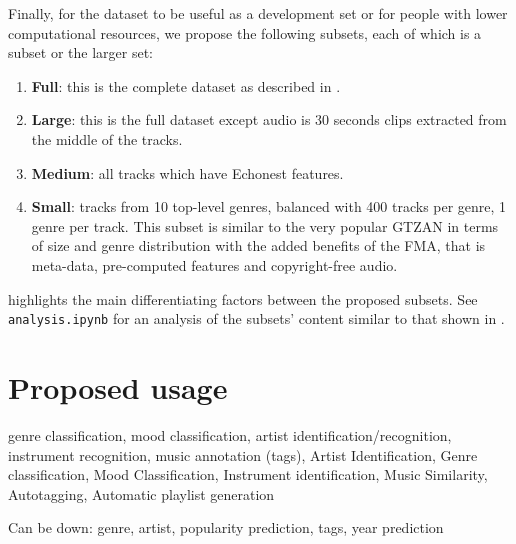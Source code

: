 \documentclass{article}
\begin{document}
Finally, for the dataset to be useful as a development set or for people with lower computational resources, we propose the following subsets, each of which is a subset or the larger set:
\begin{enumerate}
	\item \textbf{Full}: this is the complete dataset as described in .
	\item \textbf{Large}: this is the full dataset except audio is 30 seconds clips extracted from the middle of the tracks.
	\item \textbf{Medium}: all tracks which have Echonest features.
	\item \textbf{Small}: tracks from 10 top-level genres, balanced with 400 tracks per genre, 1 genre per track. This subset is similar to the very popular GTZAN in terms of size and genre distribution with the added benefits of the FMA, that is meta-data, pre-computed features and copyright-free audio.
\end{enumerate}
 highlights the main differentiating factors between the proposed subsets. See \texttt{analysis.ipynb} for an analysis of the subsets' content similar to that shown in .


\section{Proposed usage} %



genre classification, mood classification, artist identification/recognition, instrument recognition, music annotation (tags),
Artist Identification, Genre classification, Mood Classification, Instrument identification, Music Similarity, Autotagging, Automatic playlist generation

Can be down: genre, artist, popularity prediction, tags, year prediction

\end{document}
